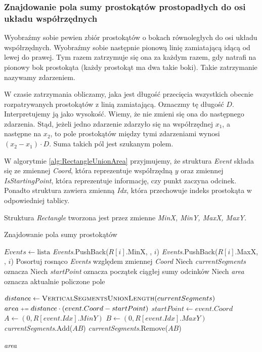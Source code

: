 \subsubsection{Znajdowanie pola sumy prostokątów prostopadłych do osi układu współrzędnych}
Wyobraźmy sobie pewien zbiór prostokątów o bokach równoległych do osi układu współrzędnych. Wyobraźmy sobie następnie pionową linię zamiatającą idącą od lewej do prawej. Tym
razem zatrzymuje się ona za każdym razem, gdy natrafi na pionowy bok prostokąta (każdy prostokąt ma dwa takie
boki). Takie zatrzymanie nazywamy zdarzeniem. 

W czasie zatrzymania obliczamy, jaka jest długość przecięcia wszystkich obecnie rozpatrywanych 
prostokątów z linią zamiatającą. Oznaczmy tę długość $D$. Interpretujemy ją jako wysokość. Wiemy, 
że nie zmieni się ona do następnego zdarzenia. Stąd, jeżeli jedno zdarzenie zdarzyło się na współrzędnej $x_1$,
a następne na $x_2$, to pole prostokątów między tymi zdarzeniami wynosi $(x_2-x_1)\cdot D$. Suma takich pól jest szukanym polem.

W algorytmie \ref{alg:RectangleUnionArea} przyjmujemy, że
struktura \textit{Event} składa się ze zmiennej \textit{Coord}, która reprezentuje
współrzędną $y$ oraz zmiennej \textit{IsStartingPoint}, która 
reprezentuje informację, czy punkt zaczyna odcinek. Ponadto 
struktura zawiera zmienną \textit{Idx}, która przechowuje
indeks prostokąta w odpowiedniej tablicy.

Struktura \textit{Rectangle} tworzona jest przez zmienne \textit{MinX, MinY, MaxX, MaxY}.

\begin{algorithm}[H]
	\caption{Znajdowanie pola sumy prostokątów}
	\begin{algorithmic}[1]
		\State $Events \gets \text{lista}$
		\State \textit{Events}.PushBack($R[i]$.MinX, \true, $i$)
		\State \textit{Events}.PushBack($R[i]$.MaxX, \false, $i$)
		\EndFor
		\State Posortuj rosnąco \textit{Events }względem zmiennej \textit{Coord}
		\State Niech \textit{currentSegments} oznacza %
		\State Niech \textit{startPoint} oznacza początek ciągłej sumy odcinków
		\State Niech \textit{area} oznacza aktualnie policzone pole
		
		\State $distance \gets \textsc{VerticalSegmentsUnionLength}(currentSegments)$
		\State $area \pleq distance \cdot (event.Coord - startPoint)$
		\EndIf
		\State $startPoint \gets event.Coord$
		\State $A \gets (0, R[event.Idx].MinY)$
		\State $B \gets (0, R[event.Idx].MaxY)$
		\State \textit{currentSegments}.Add($AB$)
		\Else
		\State \textit{currentSegments}.Remove($AB$)
		\EndIf
		\EndFor
		
		\State \Return \textit{area}
		\EndProcedure
	\end{algorithmic}
	\label{alg:RectangleUnionArea}
\end{algorithm}

